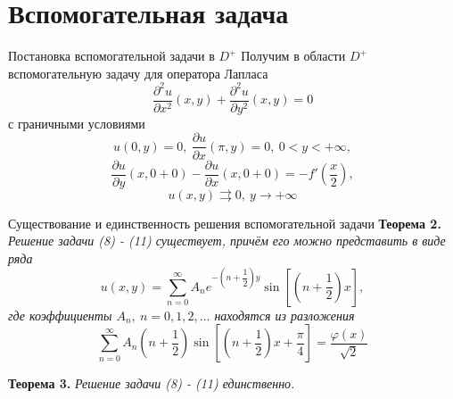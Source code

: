 \documentclass[10pt,pdf,hyperref={unicode}]{beamer}
\begin{document}
\section{Вспомогательная задача}
\begin{frame}{Постановка вспомогательной задачи в $D^+$}
	Получим в области $D^{+}$ вспомогательную задачу для оператора Лапласа 
	\begin{equation}
		\dfrac{\partial^2 u}{\partial x^2}(x,y) + \dfrac{\partial^2 u}{\partial y^2}(x,y) = 0
	\end{equation}
	с граничными условиями 
	\begin{equation}
		u(0,y) = 0, \ \dfrac{\partial u}{\partial x}(\pi, y) = 0, \ 0 < y < +\infty, 
	\end{equation}
	\begin{equation}
		\dfrac{\partial u}{\partial y}(x,0+0) - \dfrac{\partial u}{\partial x}(x,0+0) = -f'\left(\dfrac{x}{2}\right),
	\end{equation}
	\begin{equation}
		u(x,y) \rightrightarrows 0, \ y \to +\infty 
	\end{equation}
	
\end{frame}
\begin{frame}
	
	
\end{frame}
\begin{frame}{Существование и единственность решения вспомогательной задачи}
	\textbf{Теорема 2.} \textit{	Решение задачи (8) - (11) существует, причём его можно представить в виде ряда
		\begin{equation}
			u(x,y) = \sum\limits_{n=0}^{\infty} A_n e^{-\left(n + \dfrac12\right)y} \sin{\left[\left(n + \dfrac12\right)x\right]},
		\end{equation}
		где коэффициенты $A_n, \ n =0,1,2, \dots$ находятся из разложения
		\begin{equation}
			\sum\limits_{n=0}^{\infty} A_n \left(n + \dfrac12 \right) \sin{\left[\left(n +\dfrac12\right)x + \dfrac\pi4\right]} = \dfrac{\varphi(x)}{\sqrt2}
	\end{equation}}
	
	\textbf{Теорема 3.} \textit{Решение задачи (8) - (11) единственно.}
\end{frame}
\end{document}
